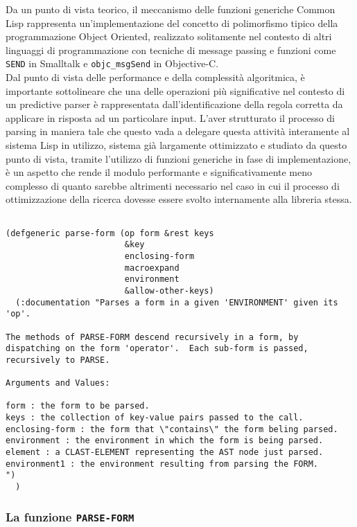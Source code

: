 Da un punto di vista teorico, il meccanismo delle funzioni generiche Common
Lisp rappresenta un’implementazione del concetto di polimorfismo tipico della
programmazione Object Oriented, realizzato solitamente nel contesto di altri
linguaggi di programmazione con tecniche di message passing e funzioni come
\texttt{SEND} in Smalltalk e \texttt{objc\_msgSend} in Objective-C.\\

Dal punto di vista delle performance e della complessità algoritmica, è
importante sottolineare che una delle operazioni più significative nel
contesto di un predictive parser è rappresentata dall’identificazione della
regola corretta da applicare in risposta ad un particolare input. L’aver
strutturato il processo di parsing in maniera tale che questo vada a delegare
questa attività interamente al sistema Lisp in utilizzo, sistema già
largamente ottimizzato e studiato da questo punto di vista, tramite l’utilizzo
di funzioni generiche in fase di implementazione, è un aspetto che rende il
modulo performante e significativamente meno complesso di quanto sarebbe
altrimenti necessario nel caso in cui il processo di ottimizzazione della
ricerca dovesse essere svolto internamente alla libreria stessa.

\begin{lstlisting}[caption=Signature della funzione \texttt{PARSE-FORM}]

(defgeneric parse-form (op form &rest keys
                        &key
                        enclosing-form
                        macroexpand
                        environment
                        &allow-other-keys)
  (:documentation "Parses a form in a given 'ENVIRONMENT' given its 'op'.

The methods of PARSE-FORM descend recursively in a form, by
dispatching on the form 'operator'.  Each sub-form is passed,
recursively to PARSE.

Arguments and Values:

form : the form to be parsed.
keys : the collection of key-value pairs passed to the call.
enclosing-form : the form that \"contains\" the form beling parsed.
environment : the environment in which the form is being parsed.
element : a CLAST-ELEMENT representing the AST node just parsed.
environment1 : the environment resulting from parsing the FORM.
")
  )

\end{lstlisting}

\subsubsection{La funzione \texttt{PARSE-FORM}}

